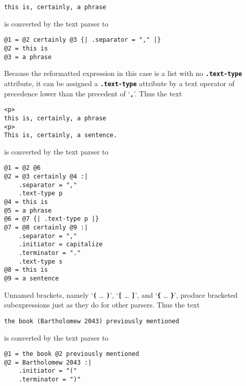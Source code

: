 \documentclass[12pt]{article}
\newcommand{\TT}[1]{{\tt \bfseries #1}}
\newenvironment{indpar}[1][0.3in]%
	{\begin{list}{}%
		     {\setlength{\itemsep}{0in}%
		      \setlength{\topsep}{0in}%
		      \setlength{\parsep}{1ex}%
		      \setlength{\labelwidth}{#1}%
		      \setlength{\leftmargin}{#1}%
		      \addtolength{\leftmargin}{\labelsep}}%
	 \item}%
	{\end{list}}
\begin{document}
\begin{indpar}\begin{verbatim}
this is, certainly, a phrase
\end{verbatim}\end{indpar}

is converted by the text parser to

\begin{indpar}\begin{verbatim}
@1 = @2 certainly @3 {| .separator = "," |}
@2 = this is
@3 = a phrase
\end{verbatim}\end{indpar}

Because the reformatted expression in this case is a list with
no \TT{.text-type} attribute, it can be assigned a \TT{.text-type}
attribute by a text operator of precedence lower than the
precedent of `\TT{,}'.  Thus the text

\begin{indpar}\begin{verbatim}
<p>
this is, certainly, a phrase
<p>
This is, certainly, a sentence.
\end{verbatim}\end{indpar}

is converted by the text parser to

\begin{indpar}\begin{verbatim}
@1 = @2 @6
@2 = @3 certainly @4 :|
    .separator = ","
    .text-type p
@4 = this is
@5 = a phrase
@6 = @7 {| .text-type p |}
@7 = @8 certainly @9 :|
    .separator = ","
    .initiator = capitalize
    .terminator = "."
    .text-type s
@8 = this is
@9 = a sentence
\end{verbatim}\end{indpar}

Unnamed brackets, namely
`\TT{(} \ldots{} \TT{)}',
`\TT{[} \ldots{} \TT{]}', and
`\TT{\{} \ldots{} \TT{\}}',
produce bracketed subexpressions just as they do for other
parsers.  Thus the text

\begin{indpar}\begin{verbatim}
the book (Bartholomew 2043) previously mentioned
\end{verbatim}\end{indpar}

is converted by the text parser to

\begin{indpar}\begin{verbatim}
@1 = the book @2 previously mentioned
@2 = Bartholomew 2043 :|
    .initiator = "("
    .terminator = ")"
\end{verbatim}\end{indpar}
\end{document}
